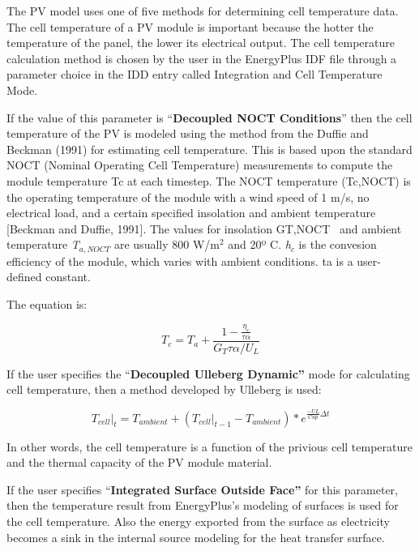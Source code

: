 The PV model uses one of five methods for determining cell temperature data. The cell temperature of a PV module is important because the hotter the temperature of the panel, the lower its electrical output. The cell temperature calculation method is chosen by the user in the EnergyPlus IDF file through a parameter choice in the IDD entry called Integration and Cell Temperature Mode.

If the value of this parameter is ``\textbf{Decoupled NOCT Conditions}'' then the cell temperature of the PV is modeled using the method from the Duffie and Beckman (1991) for estimating cell temperature. This is based upon the standard NOCT (Nominal Operating Cell Temperature) measurements to compute the module temperature Tc at each timestep. The NOCT temperature (Tc,NOCT) is the operating temperature of the module with a wind speed of 1 m/s, no electrical load, and a certain specified insolation and ambient temperature {[}Beckman and Duffie, 1991{]}. The values for insolation GT,NOCT ~and ambient temperature \emph{T\(_{a,NOCT}\)} are usually 800 W/m\(^{2}\) and 20º C. \emph{h\(_{c}\)} is the convesion efficiency of the module, which varies with ambient conditions. ta is a user-defined constant.

The equation is:

\begin{equation}
  T_c = T_a + \frac{1-\frac{\eta_c}{\tau \alpha}}{G_T \tau\alpha/U_L}
\end{equation}

If the user specifies the ``\textbf{Decoupled Ulleberg Dynamic''} mode for calculating cell temperature, then a method developed by Ulleberg is used:

\begin{equation}
{\left. {{T_{cell}}} \right|_t} = {T_{ambient}} + \left( {{{\left. {{T_{cell}}} \right|}_{t - 1}} - {T_{ambient}}} \right)*{e^{\frac{{ - UL}}{{Cap}}\Delta t}}
\end{equation}

In other words, the cell temperature is a function of the privious cell temperature and the thermal capacity of the PV module material.

If the user specifies ``\textbf{Integrated Surface Outside Face''} for this parameter, then the temperature result from EnergyPlus's modeling of surfaces is used for the cell temperature. Also the energy exported from the surface as electricity becomes a sink in the internal source modeling for the heat transfer surface.

